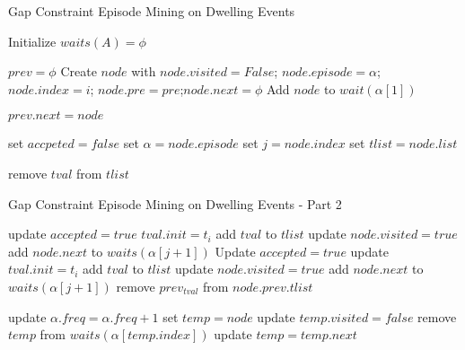 

\begin{algorithm}
\caption{Gap Constraint Episode Mining on Dwelling Events}
\label{alg_episodeMiningConstraint}
\begin{algorithmic} [1]
\STATE Initialize $waits(A)= \phi$
\ENDFOR

\STATE $prev=\phi$
\STATE Create $node$ with $node.visited=False$; $node.episode=\alpha$; $node.index=i$; $node.pre=pre$;$node.next=\phi$
\STATE Add $node$ to $wait(\alpha[1])$
\ENDIF

\STATE $prev.next=node$
\ENDIF
\ENDFOR
\ENDFOR

\STATE set $accpeted=false$
\STATE set $\alpha=node.episode$
\STATE set $j=node.index$
\STATE set $tlist=node.list$

\STATE remove $tval$ from $tlist$
\ENDIF

\end{algorithmic}
\end{algorithm}

\begin{algorithm}[h]
\caption{Gap Constraint Episode Mining on Dwelling Events - Part 2}
\begin{algorithmic} [1]


\STATE update $accepted=true$
\STATE $tval.init=t_i$
\STATE add $tval$ to $tlist$
\STATE update $node.visited=true$
\STATE add $node.next$ to $waits(\alpha[j+1])$
\ENDIF
\ELSE
{}
\STATE Update $accepted=true$
\STATE update $tval.init=t_i$
\STATE add $tval$ to $tlist$
\STATE update $node.visited=true$
\STATE add $node.next$ to $waits(\alpha[j+1])$
\ENDIF
\ENDIF
\ELSE
{}
\STATE remove $prev_{tval}$ from $node.prev.tlist$
\ENDIF
\ENDIF

\ENDFOR
\ENDIF

\ENDFOR
\ENDIF

\STATE update $\alpha.freq=\alpha.freq+1$
\STATE set $temp=node$
\STATE update $temp.visited=false$
\STATE remove $temp$ from $waits(\alpha[temp.index])$
\ENDIF
\STATE update $temp=temp.next$
\ENDWHILE
\ENDIF
\ENDFOR
\ENDFOR
\end{algorithmic}
\end{algorithm}